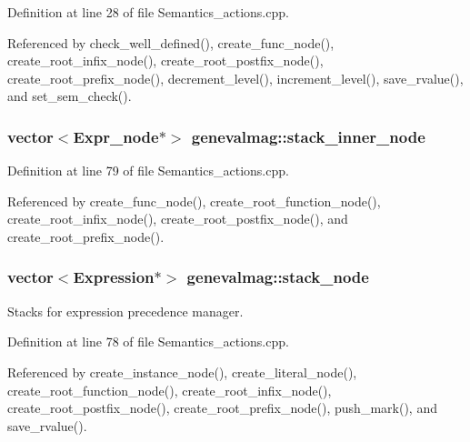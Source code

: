 Definition at line 28 of file Semantics\_\-actions.cpp.

Referenced by check\_\-well\_\-defined(), create\_\-func\_\-node(), create\_\-root\_\-infix\_\-node(), create\_\-root\_\-postfix\_\-node(), create\_\-root\_\-prefix\_\-node(), decrement\_\-level(), increment\_\-level(), save\_\-rvalue(), and set\_\-sem\_\-check().\hypertarget{namespacegenevalmag_0b445db6f5f211e8d78b693596cbda3c}{
\subsubsection[{stack\_\-inner\_\-node}]{\setlength{\rightskip}{0pt plus 5cm}vector$<${\bf Expr\_\-node}$\ast$$>$ {\bf genevalmag::stack\_\-inner\_\-node}}}
\label{namespacegenevalmag_0b445db6f5f211e8d78b693596cbda3c}




Definition at line 79 of file Semantics\_\-actions.cpp.

Referenced by create\_\-func\_\-node(), create\_\-root\_\-function\_\-node(), create\_\-root\_\-infix\_\-node(), create\_\-root\_\-postfix\_\-node(), and create\_\-root\_\-prefix\_\-node().\hypertarget{namespacegenevalmag_47998af84055c40ecfcdfe156f71be04}{
\subsubsection[{stack\_\-node}]{\setlength{\rightskip}{0pt plus 5cm}vector$<${\bf Expression}$\ast$$>$ {\bf genevalmag::stack\_\-node}}}
\label{namespacegenevalmag_47998af84055c40ecfcdfe156f71be04}


Stacks for expression precedence manager. 

Definition at line 78 of file Semantics\_\-actions.cpp.

Referenced by create\_\-instance\_\-node(), create\_\-literal\_\-node(), create\_\-root\_\-function\_\-node(), create\_\-root\_\-infix\_\-node(), create\_\-root\_\-postfix\_\-node(), create\_\-root\_\-prefix\_\-node(), push\_\-mark(), and save\_\-rvalue().